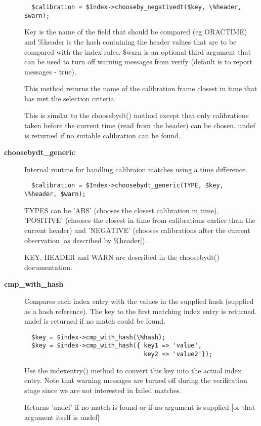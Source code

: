 \begin{description}
\begin{verbatim}
  $calibration = $Index->chooseby_negativedt($key, \%header, $warn);
\end{verbatim}


Key is the name of the field that should be compared (eg ORACTIME)
and \%header is the hash containing the header values that are to
be compared with the index rules. \$warn is an optional third argument
that can be used to turn off warning messages from verify (default
is to report messages - true).



This method returns the name of the calibration frame closest in 
time that has met the selection criteria.



This is similar to the choosebydt() method except that only
calibrations taken before the current time (read from the
header) can be chosen. undef is returned if no suitable 
calibration can be found.

\item[\textbf{choosebydt\_generic}] \mbox{}

Internal routine for handling calibraion matches using a 
time difference.

\begin{verbatim}
  $calibration = $Index->choosebydt_generic(TYPE, $key, \%header, $warn);
\end{verbatim}


TYPES can be 'ABS' (chooses the closest calibration in time), 
'POSITIVE' (chooses the closest in time from calibrations earlier
than the current header) and 'NEGATIVE' (chooses calibrations after
the current observation [as described by \%header]).



KEY, HEADER and WARN are described in the choosebydt() documentation.

\item[\textbf{cmp\_with\_hash}] \mbox{}

Compares each index entry with the values in the supplied hash
(supplied as a hash reference). The key to the first matching 
index entry is returned. undef is returned if no match could be 
found.

\begin{verbatim}
  $key = $index->cmp_with_hash(\%hash);
  $key = $index->cmp_with_hash({ key1 => 'value',
                                 key2 => 'value2'});
\end{verbatim}


Use the indexentry() method to convert this key into the actual
index entry. Note that warning messages are turned off during the
verification stage since we are not interested in failed matches.



Returns 'undef' if no match is found or if no argument is supplied
[or that argument itself is undef]

\end{description}


